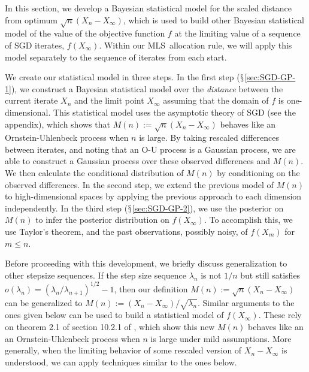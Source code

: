 \documentclass[12pt,english]{article}
\newcommand{\stedit}[1]{{\color{blue} #1}}
\newcommand{\abbrv}{MLS}
\begin{document}
In this section, we develop a Bayesian statistical model for the scaled distance from optimum $\sqrt{n}\left(X_{n}-X_{\infty}\right)$, which is used to build other Bayesian statistical model of the value of the objective function $f$ at the limiting value of a sequence of SGD iterates, $f(X_\infty)$.  Within our \abbrv\ allocation rule, we will apply this model separately to the sequence of iterates from each start.

We create our statistical model in three steps.  
In the first step ($\mathsection$\ref{sec:SGD-GP-1}),  we construct a Bayesian statistical model over the {\it distance} between the current iterate $X_n$ and the limit point $X_\infty$ \stedit{assuming that the domain of $f$ is one-dimensional}.  This statistical model uses the asymptotic theory of SGD (see the appendix), which shows that $M(n):=\sqrt{n}\left(X_{n}-X_{\infty}\right)$ behaves like an Ornstein-Uhlenbeck process when $n$ is large.
By  taking rescaled differences between iterates, and noting that an O-U process is a Gaussian process, we are able to construct a Gaussian process over these observed differences and $M(n)$. We then calculate the conditional distribution of $M(n)$ by conditioning on the observed differences. \stedit{In the second step, we extend the previous model of $M(n)$ to high-dimensional spaces by applying the previous approach to each dimension independently.} In the third step ($\mathsection$\ref{sec:SGD-GP-2}), we use the posterior on $M(n)$ to infer the posterior distribution on $f(X_\infty)$.  To accomplish this, we use \stedit{Taylor's theorem, and the past observations, possibly noisy, of $f(X_m)$ for $m \leq n$}.

Before proceeding with this development, we briefly discuss generalization to other stepsize sequences. If the step size sequence $\lambda_{n}$ is not $1/n$ but still satisfies $o(\lambda_{n}) = (\lambda_{n}/\lambda_{n+1})^{1/2}-1$, then our definition $M(n):=\sqrt{n}(X_{n}-X_{\infty})$ can be generalized to $M(n):=(X_{n}-X_{\infty})/ \sqrt{\lambda_{n}}$. Similar arguments to the ones given below can be used to build a statistical model of $f(X_\infty)$. These rely on theorem 2.1 of section 10.2.1 of \cite{kushner}, which show this new $M(n)$ behaves like an an Ornstein-Uhlenbeck process when $n$ is large under mild assumptions. More generally, when the limiting behavior of some rescaled version of $X_n - X_\infty$ is understood, we can apply techniques similar to the ones below.

\end{document}
